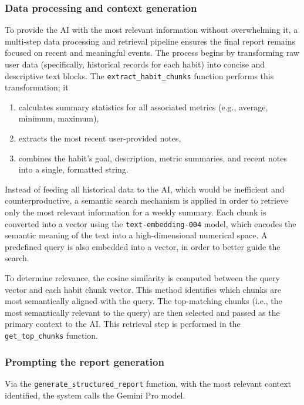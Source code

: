 \documentclass{article}
\begin{document}
\subsubsection{Data processing and context generation}

To provide the AI with the most relevant information without overwhelming it, a multi-step data processing and retrieval pipeline ensures the final report remains focused on recent and meaningful events.
The process begins by transforming raw user data (specifically, historical records for each habit) into concise and descriptive text blocks.
The \verb|extract_habit_chunks| function performs this transformation; it

\begin{enumerate}
	\item calculates summary statistics for all associated metrics (e.g., average, minimum, maximum),
	\item extracts the most recent user-provided notes,
	\item combines the habit’s goal, description, metric summaries, and recent notes into a single, formatted string.
\end{enumerate}

Instead of feeding all historical data to the AI, which would be inefficient and counterproductive, a semantic search mechanism is applied in order to retrieve only the most relevant information for a weekly summary.
Each chunk is converted into a vector using the \verb|text-embedding-004| model, which encodes the semantic meaning of the text into a high-dimensional numerical space.
A predefined query is also embedded into a vector, in order to better guide the search.

To determine relevance, the cosine similarity is computed between the query vector and each habit chunk vector.
This method identifies which chunks are most semantically aligned with the query.
The top-matching chunks (i.e., the most semantically relevant to the query) are then selected and passed as the primary context to the AI.
This retrieval step is performed in the \verb|get_top_chunks| function.

\subsubsection{Prompting the report generation}

Via the \verb|generate_structured_report| function, with the most relevant context identified, the system calls the Gemini Pro model.
\end{document}
